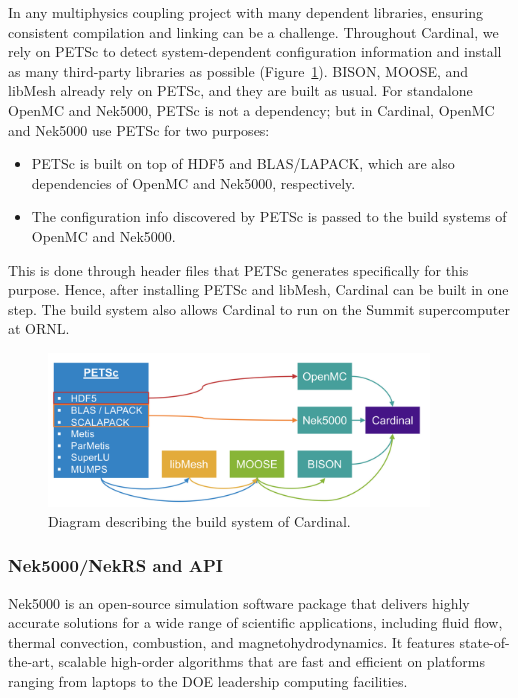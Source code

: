 In any multiphysics coupling project with many dependent libraries, ensuring consistent compilation and linking can be a challenge. Throughout Cardinal, we rely on PETSc to detect system-dependent configuration information and install as many third-party libraries as possible (Figure~\ref{f:build}). BISON, MOOSE, and libMesh already rely on PETSc, and they are built as usual. For standalone OpenMC and
Nek5000, PETSc is not a dependency; but in Cardinal, OpenMC and Nek5000 use PETSc for two purposes:
\begin{itemize}
\item PETSc is built on top of HDF5 and BLAS/LAPACK, which are also dependencies of OpenMC and Nek5000, respectively.
\item The configuration info discovered by PETSc is passed to the build systems of OpenMC and Nek5000.
\end{itemize}
This is done through header files that PETSc generates specifically for this purpose. Hence, after installing PETSc and libMesh, Cardinal can be built in one step.
The build system also allows Cardinal to run on the Summit supercomputer at ORNL.
\begin{figure}[!h]
\centering
\includegraphics[clip=true,width=0.9\textwidth]{Figures/build}
\caption{Diagram describing the build system of Cardinal.}
\label{f:build}
\end{figure}

\subsubsection{Nek5000/NekRS and API}

Nek5000 \cite{fischer2015nek5000} \cite{nek5000_github} is an open-source simulation software package
that delivers highly accurate solutions for a wide range of scientific
applications, including fluid flow, thermal convection, combustion, and
magnetohydrodynamics. It features state-of-the-art, scalable high-order
algorithms that are fast and efficient on platforms ranging from laptops to the
DOE leadership computing facilities.

